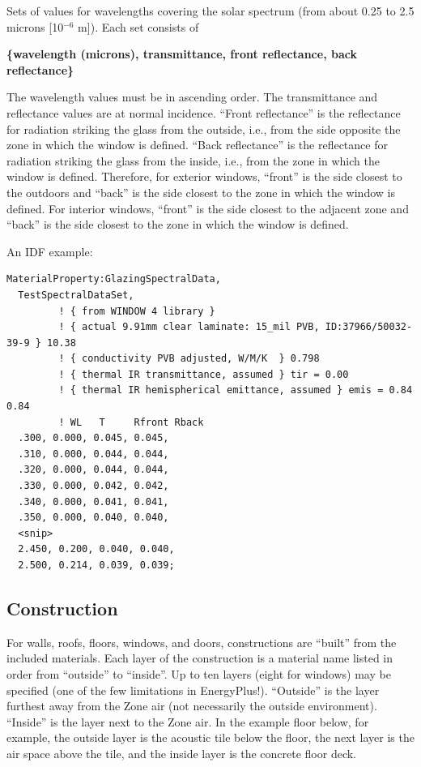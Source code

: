 Sets of values for wavelengths covering the solar spectrum (from about 0.25 to 2.5 microns {[}10\(^{-6}\) m{]}). Each set consists of

\textbf{\{wavelength (microns), transmittance, front reflectance, back reflectance\}}

The wavelength values must be in ascending order. The transmittance and reflectance values are at normal incidence. ``Front reflectance'' is the reflectance for radiation striking the glass from the outside, i.e., from the side opposite the zone in which the window is defined. ``Back reflectance'' is the reflectance for radiation striking the glass from the inside, i.e., from the zone in which the window is defined. Therefore, for exterior windows, ``front'' is the side closest to the outdoors and ``back'' is the side closest to the zone in which the window is defined. For interior windows, ``front'' is the side closest to the adjacent zone and ``back'' is the side closest to the zone in which the window is defined.

An IDF example:

\begin{lstlisting}
MaterialProperty:GlazingSpectralData,
  TestSpectralDataSet,
         ! { from WINDOW 4 library }
         ! { actual 9.91mm clear laminate: 15_mil PVB, ID:37966/50032-39-9 } 10.38
         ! { conductivity PVB adjusted, W/M/K  } 0.798
         ! { thermal IR transmittance, assumed } tir = 0.00
         ! { thermal IR hemispherical emittance, assumed } emis = 0.84 0.84
         ! WL   T     Rfront Rback
  .300, 0.000, 0.045, 0.045,
  .310, 0.000, 0.044, 0.044,
  .320, 0.000, 0.044, 0.044,
  .330, 0.000, 0.042, 0.042,
  .340, 0.000, 0.041, 0.041,
  .350, 0.000, 0.040, 0.040,
  <snip>
  2.450, 0.200, 0.040, 0.040,
  2.500, 0.214, 0.039, 0.039;
\end{lstlisting}

\subsection{Construction}\label{construction-000}

For walls, roofs, floors, windows, and doors, constructions are ``built'' from the included materials. Each layer of the construction is a material name listed in order from ``outside'' to ``inside''. Up to ten layers (eight for windows) may be specified (one of the few limitations in EnergyPlus!). ``Outside'' is the layer furthest away from the Zone air (not necessarily the outside environment). ``Inside'' is the layer next to the Zone air. In the example floor below, for example, the outside layer is the acoustic tile below the floor, the next layer is the air space above the tile, and the inside layer is the concrete floor deck.

